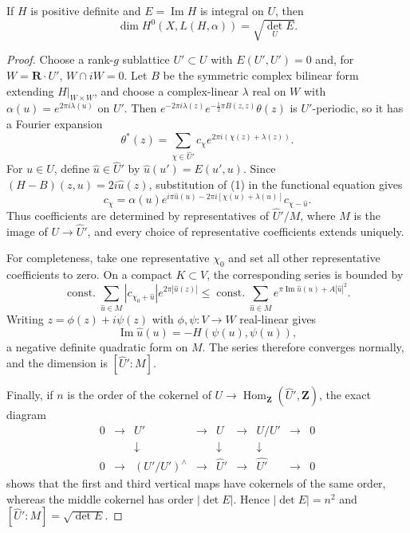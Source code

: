 \begin{proposition}
\label{mumford-source-theta-dimension}
If $H$ is positive definite and $E=\operatorname{Im}H$ is integral on $U$,
then
\[
 \dim H^0(X,L(H,\alpha))=\sqrt{\det_U E}.
\]
\end{proposition}
\begin{proof}
Choose a rank-$g$ sublattice $U'\subset U$ with $E(U',U')=0$ and, for
$W=\mathbf R\cdot U'$, $W\cap iW=0$.  Let $B$ be the symmetric complex
bilinear form extending $H|_{W\times W}$, and choose a complex-linear
$\lambda$ real on $W$ with $\alpha(u)=e^{2\pi i\lambda(u)}$ on $U'$.  Then
$e^{-2\pi i\lambda(z)}e^{-\frac12\pi B(z,z)}\theta(z)$ is $U'$-periodic,
so it has a Fourier expansion
\[
 \theta^*(z)=\sum_{\chi\in\widehat U'}c_\chi
 e^{2\pi i(\chi(z)+\lambda(z))}. \tag{1}
\]
For $u\in U$, define $\widehat u\in\widehat U'$ by
$\widehat u(u')=E(u',u)$.  Since
$(H-B)(z,u)=2i\widehat u(z)$, substitution of (1) in the functional
equation gives
\[
 c_\chi=\alpha(u)e^{i\pi\widehat u(u)-2\pi i[\chi(u)+\lambda(u)]}
 c_{\chi-\widehat u}. \tag{2}
\]
Thus coefficients are determined by representatives of
$\widehat U'/M$, where $M$ is the image of $U\to\widehat U'$, and every
choice of representative coefficients extends uniquely.

For completeness, take one representative $\chi_0$ and set all other
representative coefficients to zero.  On a compact $K\subset V$, the
corresponding series is bounded by
\[
 \operatorname{const.}\sum_{\widehat u\in M}|c_{\chi_0+\widehat u}|
 e^{2\pi|\widehat u(z)|}
 \leq\operatorname{const.}\sum_{\widehat u\in M}
 e^{\pi\operatorname{Im}\widehat u(u)+A|\widehat u|^2}.
\]
Writing $z=\phi(z)+i\psi(z)$ with $\phi,\psi:V\to W$ real-linear gives
\[
 \operatorname{Im}\widehat u(u)=-H(\psi(u),\psi(u)),
\]
a negative definite quadratic form on $M$.  The series therefore converges
normally, and the dimension is $[\widehat U':M]$.

Finally, if $n$ is the order of the cokernel of
$U\to\operatorname{Hom}_{\mathbf Z}(\widehat U',\mathbf Z)$, the exact
diagram
\[
\begin{array}{ccccccccc}
0&\to&U'&\to&U&\to&U/U'&\to&0\\
&&\downarrow&&\downarrow&&\downarrow\\
0&\to&(U'/U')^\wedge&\to&\widehat U'&\to&\widehat{U'}&\to&0
\end{array}
\]
shows that the first and third vertical maps have cokernels of the same order,
whereas the middle cokernel has order $|\det E|$.  Hence
$|\det E|=n^2$ and $[\widehat U':M]=\sqrt{\det E}$.
\end{proof}

